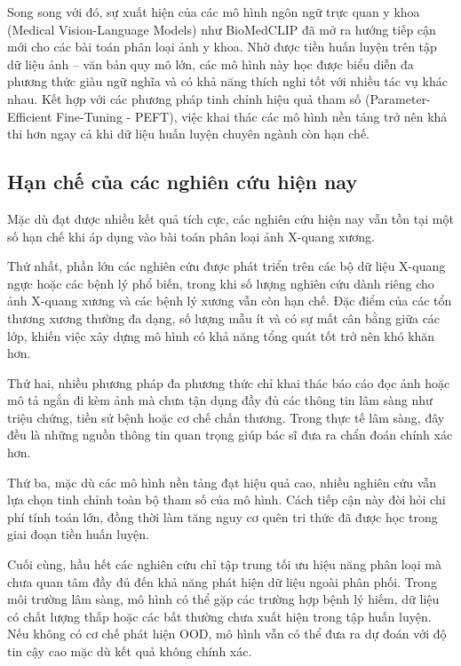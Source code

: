 Song song với đó, sự xuất hiện của các mô hình ngôn ngữ trực quan y khoa (Medical Vision-Language Models) như BioMedCLIP đã mở ra hướng tiếp cận mới cho các bài toán phân loại ảnh y khoa. Nhờ được tiền huấn luyện trên tập dữ liệu ảnh -- văn bản quy mô lớn, các mô hình này học được biểu diễn đa phương thức giàu ngữ nghĩa và có khả năng thích nghi tốt với nhiều tác vụ khác nhau. Kết hợp với các phương pháp tinh chỉnh hiệu quả tham số (Parameter-Efficient Fine-Tuning - PEFT), việc khai thác các mô hình nền tảng trở nên khả thi hơn ngay cả khi dữ liệu huấn luyện chuyên ngành còn hạn chế.

\subsection{Hạn chế của các nghiên cứu hiện nay}

Mặc dù đạt được nhiều kết quả tích cực, các nghiên cứu hiện nay vẫn tồn tại một số hạn chế khi áp dụng vào bài toán phân loại ảnh X-quang xương.

Thứ nhất, phần lớn các nghiên cứu được phát triển trên các bộ dữ liệu X-quang ngực hoặc các bệnh lý phổ biến, trong khi số lượng nghiên cứu dành riêng cho ảnh X-quang xương và các bệnh lý xương vẫn còn hạn chế. Đặc điểm của các tổn thương xương thường đa dạng, số lượng mẫu ít và có sự mất cân bằng giữa các lớp, khiến việc xây dựng mô hình có khả năng tổng quát tốt trở nên khó khăn hơn.

Thứ hai, nhiều phương pháp đa phương thức chỉ khai thác báo cáo đọc ảnh hoặc mô tả ngắn đi kèm ảnh mà chưa tận dụng đầy đủ các thông tin lâm sàng như triệu chứng, tiền sử bệnh hoặc cơ chế chấn thương. Trong thực tế lâm sàng, đây đều là những nguồn thông tin quan trọng giúp bác sĩ đưa ra chẩn đoán chính xác hơn.

Thứ ba, mặc dù các mô hình nền tảng đạt hiệu quả cao, nhiều nghiên cứu vẫn lựa chọn tinh chỉnh toàn bộ tham số của mô hình. Cách tiếp cận này đòi hỏi chi phí tính toán lớn, đồng thời làm tăng nguy cơ quên tri thức đã được học trong giai đoạn tiền huấn luyện.

Cuối cùng, hầu hết các nghiên cứu chỉ tập trung tối ưu hiệu năng phân loại mà chưa quan tâm đầy đủ đến khả năng phát hiện dữ liệu ngoài phân phối. Trong môi trường lâm sàng, mô hình có thể gặp các trường hợp bệnh lý hiếm, dữ liệu có chất lượng thấp hoặc các bất thường chưa xuất hiện trong tập huấn luyện. Nếu không có cơ chế phát hiện OOD, mô hình vẫn có thể đưa ra dự đoán với độ tin cậy cao mặc dù kết quả không chính xác.

